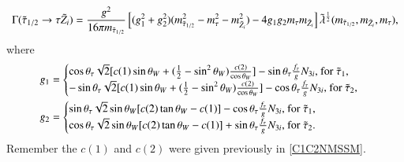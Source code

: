 \documentclass[final,3p,times]{elsarticle}
\begin{document}
\begin{equation} \label{stautauneutNMSSM}
\Gamma(\tilde{\tau}_{1/2} \rightarrow \tau \tilde{Z}_i) = {g^2 \over 16 \pi m_{\tilde{\tau}_{1/2}}}\left[(g_{1}^2 + g_{2}^2)(m_{\tilde{\tau}_{1/2}}^2 - m_{\tau}^2 - m_{\tilde{Z}_i}^2) - 4g_{1}g_{2}m_{\tau}m_{\tilde{Z}_i}\right]\tilde{\lambda}^{1 \over 2}(m_{\tilde{\tau}_{1/2}},m_{\tilde{Z}_i},m_{\tau}),
\end{equation}
where
\begin{align}
g_{1} &= \begin{cases}
		\cos\theta_{\tau} \sqrt{2} [c(1) \sin\theta_W + ({1 \over 2} - \sin^2 \theta_W){c(2) \over \cos\theta_W}] - \sin\theta_{\tau} {f_{\tau} \over g} N_{3i} $, for $\tilde{\tau}_1$,$ \\
		-\sin\theta_{\tau} \sqrt{2} [c(1) \sin\theta_W + ({1 \over 2} - \sin^2 \theta_W){c(2) \over \cos\theta_W}] - \cos\theta_{\tau} {f_{\tau} \over g} N_{3i} $, for $\tilde{\tau}_2$,$ \\
		\end{cases} \\
g_{2} &= \begin{cases}
		\sin\theta_{\tau} \sqrt{2} \sin\theta_W [c(2)\tan\theta_W - c(1)] - \cos\theta_{\tau} {f_{\tau} \over g}N_{3i} $, for $\tilde{\tau}_1$,$ \\
		\cos\theta_{\tau} \sqrt{2} \sin\theta_W [c(2)\tan\theta_W - c(1)] + \sin\theta_{\tau} {f_{\tau} \over g}N_{3i}  $, for $\tilde{\tau}_2. \\
		\end{cases}
\end{align}
Remember the $c(1)$ and $c(2)$ were given previously in \eqref{C1C2NMSSM}.
\end{document}
